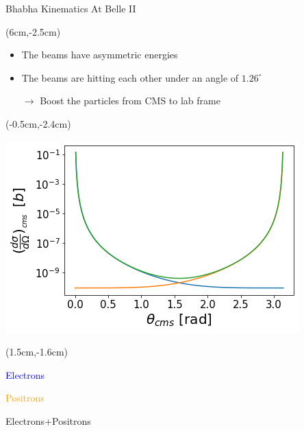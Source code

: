 \documentclass[8pt]{beamer}
\begin{document}
\begin{frame}{Bhabha Kinematics At Belle II}
	\begin{textblock*}{5cm}(6cm,-2.5cm)

		
		\begin{itemize}
			\item The beams have asymmetric energies
			
			\item The beams are hitting each other under an angle of $1.26^{\circ}$
			
			$\rightarrow$ Boost the particles from CMS to lab frame
		\end{itemize}
	\end{textblock*}

\begin{textblock*}{5.5cm}(-0.5cm,-2.4cm)
	
	\includegraphics[width=\textwidth]{VBilder/finalCross}
\end{textblock*}





	
	

\begin{textblock*}{4cm}(1.5cm,-1.6cm)
	\small{
	\textcolor{blue}{Electrons}
	
	\textcolor{orange}{Positrons}
		
	\textcolor{OliveGreen}{Electrons+Positrons}
}
\end{textblock*}



\end{frame}
\end{document}
